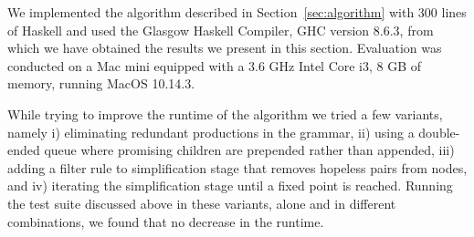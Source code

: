 We implemented the algorithm described in Section~\ref{sec:algorithm}
with 300 lines of Haskell and used the Glasgow Haskell Compiler, GHC
version 8.6.3, from which we have obtained the results we present in
this section.  Evaluation was conducted on a Mac mini equipped with a
3.6 GHz Intel Core i3, 8 GB of memory, running MacOS 10.14.3. 


While trying to improve the runtime of the algorithm we tried a few
variants, namely
i) eliminating redundant productions in the grammar,
ii) using a double-ended queue where promising children are prepended
  rather than appended,
iii) adding a filter rule to simplification stage that removes hopeless
  pairs from nodes, and
iv) iterating the simplification stage until a fixed point is reached.
%
Running the test suite discussed above in these variants, alone and
in different combinations, we found that no decrease in the runtime.




